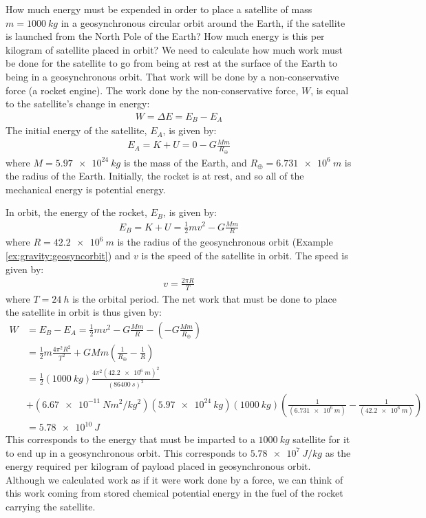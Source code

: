\begin{example}{How much energy must be expended in order to place a satellite of mass $m=\SI{1000}{kg}$ in a geosynchronous circular orbit around the Earth, if the satellite is launched from the North Pole of the Earth? How much energy is this per kilogram of satellite placed in orbit?}
We need to calculate how much work must be done for the satellite to go from being at rest at the surface of the Earth to being in a geosynchronous orbit. That work will be done by a non-conservative force (a rocket engine). The work done by the non-conservative force, $W$, is equal to the satellite's change in energy:
\begin{align*}
W = \Delta E = E_B -E_A
\end{align*}
The initial energy of the satellite, $E_A$, is given by:
\begin{align*}
E_A = K + U = 0 - G\frac{Mm}{R_\oplus}
\end{align*}
where $M=\SI{5.97e24}{kg}$ is the mass of the Earth, and $R_\oplus=\SI{6.731e6}{m}$ is the radius of the Earth. Initially, the rocket is at rest, and so all of the mechanical energy is potential energy. 

In orbit, the energy of the rocket, $E_B$, is given by:
\begin{align*}
E_B = K + U = \frac{1}{2}mv^2 - G\frac{Mm}{R}
\end{align*}
where $R=\SI{42.2e6}{m}$ is the radius of the geosynchronous orbit (Example \ref{ex:gravity:geosyncorbit}) and $v$ is the speed of the satellite in orbit. The speed is given by:
\begin{align*}
v = \frac{2\pi R}{T}
\end{align*}
where $T=\SI{24}{h}$ is the orbital period. The net work that must be done to place the satellite in orbit is thus given by:
\begin{align*}
W &= E_B - E_A = \frac{1}{2}mv^2 - G\frac{Mm}{R} - \left(- G\frac{Mm}{R_\oplus}\right)\\
&=\frac{1}{2}m\frac{4\pi^2 R^2}{T^2}+GMm\left(\frac{1}{R_\oplus}-\frac{1}{R}\right)\\
&=\frac{1}{2}(\SI{1000}{kg})\frac{4\pi^2 (\SI{42.2e6}{m})^2}{(\SI{86400}{s})^2}\\
&+(\SI{6.67e-11}{Nm^2/kg^2})(\SI{5.97e24}{kg})(\SI{1000}{kg})\left(\frac{1}{(\SI{6.731e6}{m})}-\frac{1}{(\SI{42.2e6}{m})}\right)\\
&=\SI{5.78e10}{J}
\end{align*}
This corresponds to the energy that must be imparted to a $\SI{1000}{kg}$ satellite for it to end up in a geosynchronous orbit. This corresponds to $\SI{5.78e7}{J/kg}$ as the energy required per kilogram of payload placed in geosynchronous orbit. Although we calculated work as if it were work done by a force, we can think of this work coming from stored chemical potential energy in the fuel of the rocket carrying the satellite. 


\end{example}
